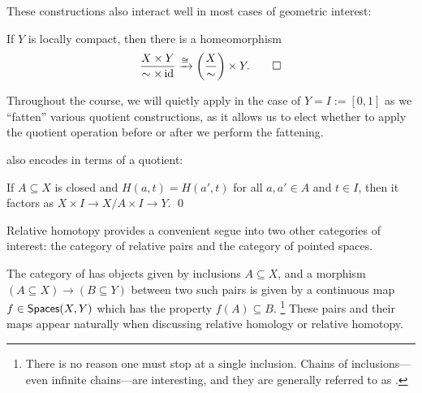 \noindent
These constructions also interact well in most cases of geometric interest:

\begin{lemma}\label{ProdQuotInterchange}
If $Y$ is locally compact, then there is a homeomorphism \[\frac{X \times Y}{\sim \times \operatorname{id}} \xrightarrow{\cong} \left( \frac{X}{\sim}\right) \times Y. \qed\]
\end{lemma}

\begin{remark}
Throughout the course, we will quietly apply  in the case of $Y = I := [0, 1]$ as we ``fatten'' various quotient constructions, as it allows us to elect whether to apply the quotient operation before or after we perform the fattening.
\end{remark}

\noindent
{} also encodes  in terms of a quotient:


\begin{corollary}
If $A \subseteq X$ is closed and $H(a, t) = H(a', t)$ for all $a, a' \in A$ and $t \in I$, then it factors as $X \times I \to X/A \times I \to Y$. \qed
\end{corollary}

Relative homotopy provides a convenient segue into two other categories of interest: the category of relative pairs and the category of pointed spaces.

\begin{definition}
The category of  has objects given by inclusions $A \subseteq X$, and a morphism $(A \subseteq X) \to (B \subseteq Y)$ between two such pairs is given by a continuous map $f \in \mathsf{Spaces}(X, Y)$ which has the property $f(A) \subseteq B$.
\footnote{There is no reason one must stop at a single inclusion.
Chains of inclusions---even infinite chains---are interesting, and they are generally referred to as .}
These pairs and their maps appear naturally when discussing relative homology or relative homotopy.
\end{definition}

